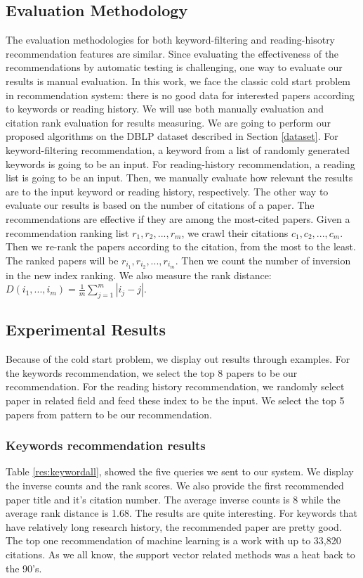 \subsection{Evaluation Methodology}
%
The evaluation methodologies for both keyword-filtering and reading-hisotry recommendation features are similar.
%
Since evaluating the effectiveness of the recommendations by automatic testing is challenging, one way to evaluate our results is manual evaluation. In this work, we face the classic cold start problem in recommendation system: there is no good data for interested papers according to keywords or reading history. We will use both manually evaluation and citation rank evaluation for results measuring.
%
We are going to perform our proposed algorithms on the DBLP dataset described in Section \ref{dataset}.
%
For keyword-filtering recommendation, a keyword from a list of randomly generated keywords is going to be an input.
%
For reading-history recommendation, a reading list is going to be an input.
%
Then, we manually evaluate how relevant the results are to the input keyword or reading history, respectively.
%
The other way to evaluate our results is based on the number of citations of a paper. The recommendations are effective if they are among the most-cited papers.
%
Given a recommendation ranking list $r_1, r_2, ..., r_m$, we crawl their citations $c_1, c_2, ..., c_m$. Then we re-rank the papers according to the citation, from the most to the least. The ranked papers will be $r_{i_1}, r_{i_2},..., r_{i_m}$. Then we count the number of inversion in the new index ranking. We also measure the rank distance: $D(i_1, ..., i_m) = \frac{1}{m} \sum_{j=1}^m |i_j - j|$.
%

\subsection{Experimental Results}
%
Because of the cold start problem, we display out results through examples. For the keywords recommendation, we select the top 8 papers to be our recommendation. For the reading history recommendation, we randomly select paper in related field and feed these index to be the input. We select the top 5 papers from pattern to be our recommendation.

\subsubsection{Keywords recommendation results}

Table \ref{res:keywordall}, showed the five queries we sent to our system. We display the inverse counts and the rank scores. We also provide the first recommended paper title and it's citation number. The average inverse counts is 8 while the average rank distance is 1.68. The results are quite interesting. For keywords that have relatively long research history, the recommended paper are pretty good. The top one recommendation of machine learning is a work with up to 33,820 citations. As we all know, the support vector related methods was a heat back to the 90's. 

